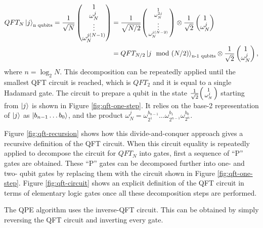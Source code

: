 \documentclass[prb,preprint]{revtex4}
\begin{document}
	\begin{align}
		QFT_N \ket{j}_{\text{n qubits}} = \frac{1}{\sqrt{N}}\begin{pmatrix}1 \\ \omega_N^j \\ \vdots \\ \omega_N^{j(N-1)}\end{pmatrix} &= \frac{1}{\sqrt{N/2}}\begin{psmallmatrix}1 \\ \omega_N^{2j} \\ \vdots \\ \omega_N^{j(N-2)}\end{psmallmatrix} \otimes \frac{1}{\sqrt{2}}\begin{pmatrix}1 \\ \omega_N^j\end{pmatrix} \nonumber \\
		&= QFT_{N/2} \ket{j \mod (N/2)}_{\text{n-1 qubits}} \otimes \frac{1}{\sqrt{2}}\begin{pmatrix}1 \\ \omega_N^j\end{pmatrix},
	\end{align}
where $n= \log_2 N$. This decomposition can be repeatedly applied until the smallest QFT circuit is reached, which is $QFT_2$ and it is equal to a single Hadamard gate. The circuit to prepare a qubit in the state $\frac{1}{\sqrt{2}}\begin{psmallmatrix}1 \\ \omega_N^j\end{psmallmatrix}$ starting from $\ket{j}$ is shown in Figure \ref{fig:qft-one-step}. It relies on the base-2 representation of $\ket{j}$ as $\ket{b_{n-1}\dots b_0}$, and the product $\omega_N^j = \omega_{2^1}^{b_{n-1}}\dots\omega_{2^{n-1}}^{b_1}\omega_{2^n}^{b_0}.$

	Figure \ref{fig:qft-recursion} shows how this divide-and-conquer approach gives a recursive definition of the QFT circuit. When this circuit equality is repeatedly applied to decompose the circuit for $QFT_N$ into gates, first a sequence of ``P'' gates are obtained. These ``P'' gates can be decomposed further into one- and two- qubit gates by replacing them with the circuit shown in Figure \ref{fig:qft-one-step}. Figure \ref{fig:qft-circuit} shows an explicit definition of the QFT circuit in terms of elementary logic gates once all these decomposition steps are performed. 
	
	The QPE algorithm uses the inverse-QFT circuit. This can be obtained by simply reversing the QFT circuit and inverting every gate. 
\end{document}
